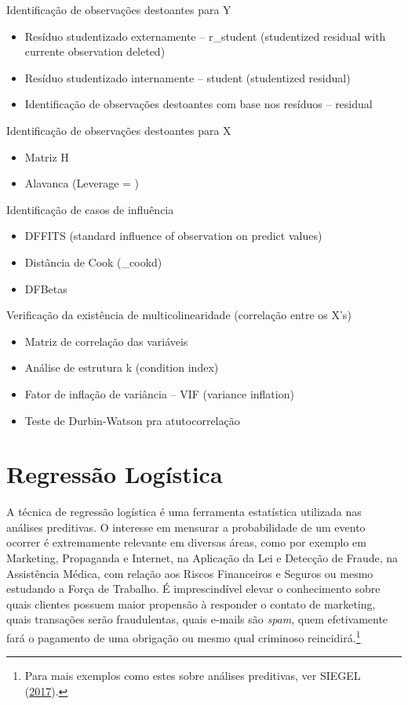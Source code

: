 \documentclass[12pt,brazil,oneside]{book}
\providecommand{\tightlist}{%
  \setlength{\itemsep}{0pt}\setlength{\parskip}{0pt}}
\let\rmarkdownfootnote\footnote%
\def\footnote{\protect\rmarkdownfootnote}
\begin{document}
Identificação de observações destoantes para Y

\begin{itemize}
\tightlist
\item
  Resíduo studentizado externamente -- r\_student (studentized residual
  with currente observation deleted)
\item
  Resíduo studentizado internamente -- student (studentized residual)
\item
  Identificação de observações destoantes com base nos resíduos --
  residual
\end{itemize}

Identificação de observações destoantes para X

\begin{itemize}
\tightlist
\item
  Matriz H
\item
  Alavanca (Leverage = )
\end{itemize}

Identificação de casos de influência

\begin{itemize}
\tightlist
\item
  DFFITS (standard influence of observation on predict values)
\item
  Distância de Cook (\_cookd)
\item
  DFBetas
\end{itemize}

Verificação da existência de multicolinearidade (correlação entre os
X's)

\begin{itemize}
\tightlist
\item
  Matriz de correlação das variáveis
\item
  Análise de estrutura k (condition index)
\item
  Fator de inflação de variância -- VIF (variance inflation)
\item
  Teste de Durbin-Watson pra atutocorrelação
\end{itemize}

\hypertarget{regressao-logistica}{%
\chapter{Regressão Logística}\label{regressao-logistica}}

A técnica de regressão logística é uma ferramenta estatística utilizada
nas análises preditivas. O interesse em mensurar a probabilidade de um
evento ocorrer é extremamente relevante em diversas áreas, como por
exemplo em Marketing, Propaganda e Internet, na Aplicação da Lei e
Detecção de Fraude, na Assistência Médica, com relação aos Riscos
Financeiros e Seguros ou mesmo estudando a Força de Trabalho. É
imprescindível elevar o conhecimento sobre quais clientes possuem maior
propensão à responder o contato de marketing, quais transações serão
fraudulentas, quais e-mails são \emph{spam}, quem efetivamente fará o
pagamento de uma obrigação ou mesmo qual criminoso reincidirá.\footnote{Para
  mais exemplos como estes sobre análises preditivas, ver SIEGEL
  (\protect\hyperlink{ref-Siegel2017}{2017}).}
\end{document}
